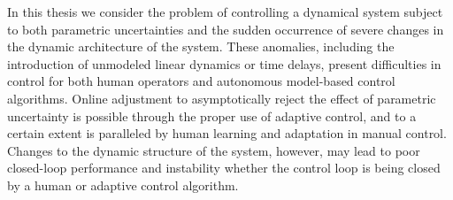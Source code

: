 % 
% 
%



In this thesis we consider the problem of controlling a dynamical system subject to both parametric uncertainties and the sudden occurrence of severe changes in the dynamic architecture of the system. These anomalies, including the introduction of unmodeled linear dynamics or time delays, present difficulties in control for both human operators and autonomous model-based control algorithms. Online adjustment to asymptotically reject the effect of parametric uncertainty is possible through the proper use of adaptive control, and to a certain extent is paralleled by human learning and adaptation in manual control. Changes to the dynamic structure of the system, however, may lead to poor closed-loop performance and instability whether the control loop is being closed by a human or adaptive control algorithm.

